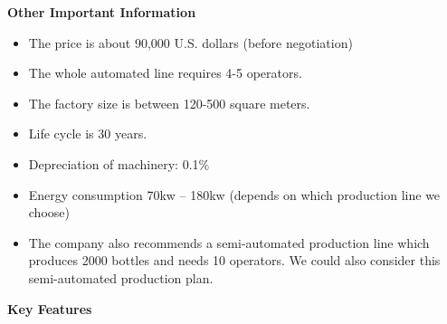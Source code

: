 \documentclass{article}
\begin{document}
\textbf{Other Important Information}

\begin{itemize}
    \item The price is about 90,000 U.S. dollars (before negotiation)
    \item The whole automated line requires 4-5 operators.
    \item The factory size is between 120-500 square meters.
    \item Life cycle is 30 years.
    \item Depreciation of machinery: 0.1\%
    \item Energy consumption 70kw -- 180kw (depends on which production line we choose)
    \item The company also recommends a semi-automated production line which produces 2000 bottles and needs 10 operators. We could also consider this semi-automated production plan.
\end{itemize}

\textbf{Key Features}
\end{document}
